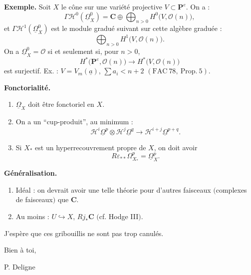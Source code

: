 \documentclass[11pt]{article}
\newcommand{\OO}{\mathcal O}
\newcommand{\CC}{\mathbf C}
\newcommand{\PP}{\mathbf P}
\newcommand{\HH}{\mathcal H}
\newcommand{\uOmega}{\underline{\Omega}}
\newcommand{\eps}{\varepsilon}
\begin{document}
\textbf{Exemple.} Soit \(X\) le cône sur une variété projective \(V\subset\PP^e\). On a :
\[
\Gamma\HH^0(\uOmega^0_X)=\CC\oplus\bigoplus_{n>0}H^0\bigl(V,\OO(n)\bigr),
\]
et \(\Gamma\HH^1(\uOmega^0_X)\) est le module gradué suivant sur cette algèbre graduée :
\[
\bigoplus_{n>0}H^1\bigl(V,\OO(n)\bigr).
\]
On a \(\uOmega^0_X=\OO\) si et seulement si, pour \(n>0\),
\[
H^\ast\bigl(\PP^e,\OO(n)\bigr)\longrightarrow H^\ast\bigl(V,\OO(n)\bigr)
\]
est surjectif. Ex. : \(V=V_m(\underline a)\), \(\sum a_i<n+2\) \((\mathrm{FAC}\ 78,\ \mathrm{Prop.}\ 5)\).

\textbf{Fonctorialité.}
\begin{enumerate}[label=\alph*)]
\item \(\uOmega_X\) doit être fonctoriel en \(X\).
\item On a un ``cup-produit'', au minimum :
\[
\HH^i\uOmega^p\otimes\HH^j\uOmega^q\longrightarrow
\HH^{i+j}\uOmega^{p+q}.
\]
\item Si \(X_\ast\) est un hyperrecouvrement propre de \(X\), on doit avoir
\[
R\eps_{\ast\ast}\Omega^p_{X_\ast}=\uOmega^p_X.
\]
\end{enumerate}

\textbf{Généralisation.}
\begin{enumerate}[label=\alph*)]
\item Idéal : on devrait avoir une telle théorie pour d'autres faisceaux \(\bigl(\)complexes de faisceaux\(\bigr)\) que \(\CC\).
\item Au moins : \(U\hookrightarrow X\), \(Rj_\ast\CC\) \((\)cf. Hodge III\()\).
\end{enumerate}

J'espère que ces gribouillis ne sont pas trop canulés.

Bien à toi,

\hspace{2em}P. Deligne
\end{document}
